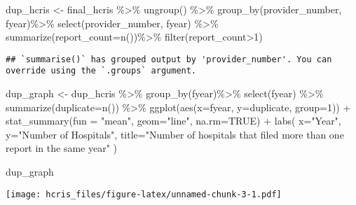 \documentclass[
]{article}
\newenvironment{Shaded}{\begin{snugshade}}{\end{snugshade}}
\newcommand{\AttributeTok}[1]{\textcolor[rgb]{0.77,0.63,0.00}{#1}}
\newcommand{\ConstantTok}[1]{\textcolor[rgb]{0.00,0.00,0.00}{#1}}
\newcommand{\DecValTok}[1]{\textcolor[rgb]{0.00,0.00,0.81}{#1}}
\newcommand{\FunctionTok}[1]{\textcolor[rgb]{0.00,0.00,0.00}{#1}}
\newcommand{\NormalTok}[1]{#1}
\newcommand{\OtherTok}[1]{\textcolor[rgb]{0.56,0.35,0.01}{#1}}
\newcommand{\SpecialCharTok}[1]{\textcolor[rgb]{0.00,0.00,0.00}{#1}}
\newcommand{\StringTok}[1]{\textcolor[rgb]{0.31,0.60,0.02}{#1}}
\begin{document}
\begin{Shaded}
\begin{Highlighting}[]
\NormalTok{dup\_hcris }\OtherTok{\textless{}{-}}\NormalTok{ final\_hcris }\SpecialCharTok{\%\textgreater{}\%} 
  \FunctionTok{ungroup}\NormalTok{() }\SpecialCharTok{\%\textgreater{}\%}
  \FunctionTok{group\_by}\NormalTok{(provider\_number, fyear)}\SpecialCharTok{\%\textgreater{}\%}
  \FunctionTok{select}\NormalTok{(provider\_number, fyear) }\SpecialCharTok{\%\textgreater{}\%}
  \FunctionTok{summarize}\NormalTok{(}\AttributeTok{report\_count=}\FunctionTok{n}\NormalTok{())}\SpecialCharTok{\%\textgreater{}\%}
  \FunctionTok{filter}\NormalTok{(report\_count}\SpecialCharTok{\textgreater{}}\DecValTok{1}\NormalTok{)}
\end{Highlighting}
\end{Shaded}

\begin{verbatim}
## `summarise()` has grouped output by 'provider_number'. You can override using the `.groups` argument.
\end{verbatim}

\begin{Shaded}
\begin{Highlighting}[]
\NormalTok{dup\_graph }\OtherTok{\textless{}{-}}\NormalTok{ dup\_hcris }\SpecialCharTok{\%\textgreater{}\%}
  \FunctionTok{group\_by}\NormalTok{(fyear)}\SpecialCharTok{\%\textgreater{}\%}
  \FunctionTok{select}\NormalTok{(fyear) }\SpecialCharTok{\%\textgreater{}\%}
  \FunctionTok{summarize}\NormalTok{(}\AttributeTok{duplicate=}\FunctionTok{n}\NormalTok{()) }\SpecialCharTok{\%\textgreater{}\%}
  \FunctionTok{ggplot}\NormalTok{(}\FunctionTok{aes}\NormalTok{(}\AttributeTok{x=}\NormalTok{fyear, }\AttributeTok{y=}\NormalTok{duplicate, }\AttributeTok{group=}\DecValTok{1}\NormalTok{)) }\SpecialCharTok{+}
  \FunctionTok{stat\_summary}\NormalTok{(}\AttributeTok{fun =} \StringTok{"mean"}\NormalTok{, }\AttributeTok{geom=}\StringTok{"line"}\NormalTok{, }\AttributeTok{na.rm=}\ConstantTok{TRUE}\NormalTok{) }\SpecialCharTok{+}
  \FunctionTok{labs}\NormalTok{(}
    \AttributeTok{x=}\StringTok{"Year"}\NormalTok{,}
    \AttributeTok{y=}\StringTok{"Number of Hospitals"}\NormalTok{,}
    \AttributeTok{title=}\StringTok{"Number of hospitals that filed more than one report in the same year"}
\NormalTok{  )}

\NormalTok{dup\_graph}
\end{Highlighting}
\end{Shaded}

\texttt{[image: hcris\_files/figure-latex/unnamed-chunk-3-1.pdf]}
\end{document}
